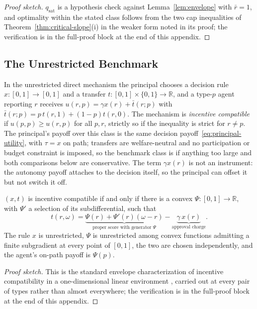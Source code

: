 \documentclass[acmsmall,nonacm,screen]{acmart}
\theoremstyle{acmplain}%
\theoremstyle{acmdefinition}%
\newcommand{\R}{\mathbb{R}}
\numberwithin{equation}{section}
\newcommand{\suppsec}[1]{the full-proof block at the end of this appendix}
\begin{document}
\begin{appendix}
\begin{proof}[Proof sketch]
$q_{\mathrm{sat}}$ is a hypothesis check against Lemma~\ref{lem:envelope} with $\bar r=1$, and optimality within the stated class follows from the two cap inequalities of Theorem~\ref{thm:critical-slope}(i) in the weaker form noted in its proof; the verification is in \suppsec{S.7}.
\end{proof}


\subsection{The Unrestricted Benchmark}\label{app:benchmark}

In the unrestricted direct mechanism the principal chooses a decision rule $x:[0,1]\to[0,1]$ and a transfer $t:[0,1]\times\{0,1\}\to\R$, and a type-$p$ agent reporting $r$ receives $u(r,p)=\gamma x(r)+\bar t(r;p)$ with $\bar t(r;p)=p\,t(r,1)+(1-p)t(r,0)$. The mechanism is \emph{incentive compatible} if $u(p,p)\geq u(r,p)$ for all $p,r$, strictly so if the inequality is strict for $r\neq p$. The principal's payoff over this class is the same decision payoff~\eqref{eq:principal-utility}, with $\tau=x$ on path; transfers are welfare-neutral and no participation or budget constraint is imposed, so the benchmark class is if anything too large and both comparisons below are conservative. The term $\gamma x(r)$ is not an instrument: the autonomy payoff attaches to the decision itself, so the principal can offset it but not switch it off.

\begin{theorem}\label{thm:canonical-form}
$(x,t)$ is incentive compatible if and only if there is a convex $\Psi:[0,1]\to\R$, with $\Psi'$ a selection of its subdifferential, such that
\begin{equation}\label{eq:canonical-form}
t(r,\omega)=\underbrace{\Psi(r)+\Psi'(r)(\omega-r)}_{\text{proper score with generator }\Psi}-\underbrace{\gamma\,x(r)}_{\text{approval charge}} .
\end{equation}
The rule $x$ is unrestricted, $\Psi$ is unrestricted among convex functions admitting a finite subgradient at every point of $[0,1]$, the two are chosen independently, and the agent's on-path payoff is $\Psi(p)$.
\end{theorem}

\begin{proof}[Proof sketch]
This is the standard envelope characterization of incentive compatibility in a one-dimensional linear environment \citep{myerson1981optimal,rochet1987necessary,vohra2011mechanism}, carried out at every pair of types rather than almost everywhere; the verification is in \suppsec{S.8}.
\end{proof}


\end{appendix}
\end{document}

